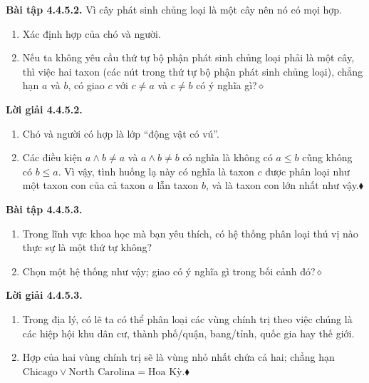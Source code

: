 \noindent\textbf{Bài tập 4.4.5.2.}\keepwithnext
Vì cây phát sinh chủng loại là một cây nên nó có mọi hợp.
\begin{enumerate}[label=\alph*.]
\item Xác định hợp của chó và người.
\item Nếu ta không yêu cầu thứ tự bộ phận phát sinh chủng loại phải là một cây, thì việc hai taxon (các nút trong thứ tự bộ phận phát sinh chủng loại), chẳng hạn $a$ và $b$, có giao $c$ với $c\ne a$ và $c\ne b$ có ý nghĩa gì?\nobreak\hfill$\diamond$
\end{enumerate}

\noindent\textbf{Lời giải 4.4.5.2.}\keepwithnext
\begin{enumerate}[label=\alph*.]
\item Chó và người có hợp là lớp ``động vật có vú''.
\item Các điều kiện $a\wedge b\ne a$ và $a\wedge b\ne b$ có nghĩa là không có $a\le b$ cũng không có $b\le a$. Vì vậy, tình huống lạ này có nghĩa là taxon $c$ được phân loại như một taxon con của cả taxon $a$ lẫn taxon $b$, và là taxon con lớn nhất như vậy.\nobreak\hfill$\blacklozenge$
\end{enumerate}

\noindent\textbf{Bài tập 4.4.5.3.}\keepwithnext
\begin{enumerate}[label=\alph*.]
\item Trong lĩnh vực khoa học mà bạn yêu thích, có hệ thống phân loại thú vị nào thực sự là một thứ tự không?
\item Chọn một hệ thống như vậy; giao có ý nghĩa gì trong bối cảnh đó?\nobreak\hfill$\diamond$
\end{enumerate}

\noindent\textbf{Lời giải 4.4.5.3.}\keepwithnext
\begin{enumerate}[label=\alph*.]
\item Trong địa lý, có lẽ ta có thể phân loại các vùng chính trị theo việc chúng là các hiệp hội khu dân cư, thành phố/quận, bang/tỉnh, quốc gia hay thế giới.
\item Hợp của hai vùng chính trị sẽ là vùng nhỏ nhất chứa cả hai; chẳng hạn $\text{Chicago}\vee\text{North Carolina}=\text{Hoa Kỳ}$.\nobreak\hfill$\blacklozenge$
\end{enumerate}

